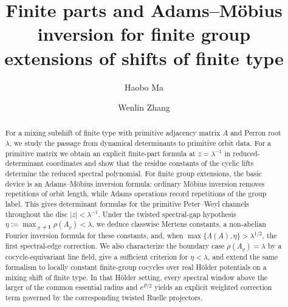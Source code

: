 \documentclass[11pt,a4paper]{amsart}
\title[Finite Parts and Adams--M\"obius Inversion]{Finite parts and Adams--M\"obius inversion for finite group extensions of shifts of finite type}
\author{Haobo Ma}
\author{Wenlin Zhang}
\date{}
\theoremstyle{plain}
\theoremstyle{definition}
\theoremstyle{remark}
\begin{document}
\begin{abstract}
For a mixing subshift of finite type with primitive adjacency matrix
\(A\) and Perron root \(\lambda\), we study the passage from dynamical
determinants to primitive orbit data. For a primitive matrix we obtain
an explicit finite-part formula at \(z=\lambda^{-1}\) in
reduced-determinant coordinates and show that the residue constants of
the cyclic lifts determine the reduced spectral polynomial. For finite
group extensions, the basic device is an Adams--M\"obius inversion
formula: ordinary M\"obius inversion removes repetitions of orbit
length, while Adams operations record repetitions of the group label.
This gives determinant formulas for the primitive Peter--Weyl channels
throughout the disc \(|z|<\lambda^{-1}\). Under the twisted spectral-gap
hypothesis
\(\eta:=\max_{\varrho\neq\mathbf{1}}\rho(A_\varrho)<\lambda\), we deduce
classwise Mertens constants, a non-abelian Fourier inversion formula
for these constants, and, when
\(\max\{\Lambda(A),\eta\}>\lambda^{1/2}\), the first spectral-edge
correction. We also characterize the boundary case
\(\rho(A_\varrho)=\lambda\) by a cocycle-equivariant line field, give a
sufficient criterion for \(\eta<\lambda\), and extend the same formalism
to locally constant finite-group cocycles over real H\"older potentials
on a mixing shift of finite type. In that H\"older setting, every
spectral window above the larger of the common essential radius and
\(e^{P/2}\) yields an explicit weighted correction term governed by the
corresponding twisted Ruelle projectors.
\end{abstract}


\maketitle






\appendix

\end{document}
